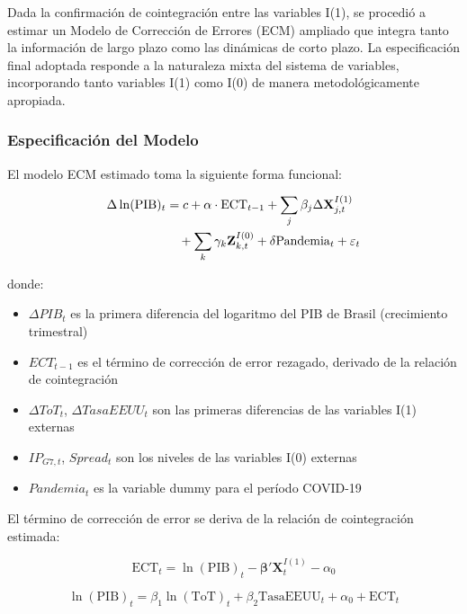 \documentclass[3p,11pt]{elsarticle}
\begin{document}
Dada la confirmación de cointegración entre las variables I(1), se procedió a estimar un Modelo de Corrección de Errores (ECM) ampliado que integra tanto la información de largo plazo como las dinámicas de corto plazo. La especificación final adoptada responde a la naturaleza mixta del sistema de variables, incorporando tanto variables I(1) como I(0) de manera metodológicamente apropiada.

\subsubsection{Especificación del Modelo}

El modelo ECM estimado toma la siguiente forma funcional:

\begin{align}
\Delta \ln(\text{PIB})_{t} &= c + \alpha \cdot \text{ECT}_{t-1} + \sum_{j} \beta_j \Delta \mathbf{X}_{j,t}^{I(1)} \notag \\
&\quad + \sum_{k} \gamma_k \mathbf{Z}_{k,t}^{I(0)} + \delta \text{Pandemia}_{t} + \varepsilon_{t} \label{eq:ecm_main}
\end{align}

donde:
\begin{itemize}
    \item $\Delta PIB_{t}$ es la primera diferencia del logaritmo del PIB de Brasil (crecimiento trimestral)
    \item $ECT_{t-1}$ es el término de corrección de error rezagado, derivado de la relación de cointegración
    \item $\Delta ToT_{t}$, $\Delta TasaEEUU_{t}$ son las primeras diferencias de las variables I(1) externas
    \item $IP_{G7,t}$, $Spread_{t}$ son los niveles de las variables I(0) externas
    \item $Pandemia_{t}$ es la variable dummy para el período COVID-19
\end{itemize}

El término de corrección de error se deriva de la relación de cointegración estimada:

\begin{equation}
\text{ECT}_{t} = \ln(\text{PIB})_{t} - \boldsymbol{\beta}'\mathbf{X}_{t}^{I(1)} - \alpha_0 \label{eq:ect_definition}
\end{equation}


\begin{equation}
\ln(\text{PIB})_{t} = \beta_1 \ln(\text{ToT})_{t} + \beta_2 \text{TasaEEUU}_{t} + \alpha_0 + \text{ECT}_{t} \label{eq:coint_relation}
\end{equation}
\end{document}
